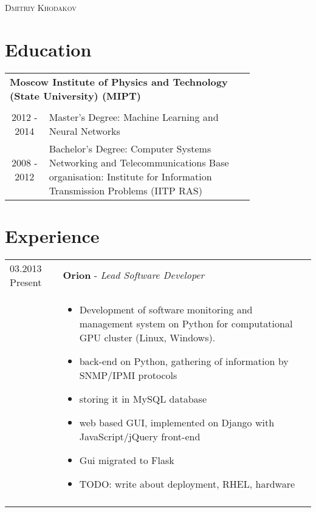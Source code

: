 \documentclass[a4paper, oneside, final]{scrartcl}
\begin{document}
\begin{center} %


{\fontsize{24}{24}\selectfont\scshape Dmitriy Khodakov} %

\section{\textbf{Education}}

\begin{tabularx}{0.99\linewidth}{cp{0.8\linewidth}l}
\multicolumn{2}{l}{\textbf{Moscow Institute of Physics and Technology (State University) (MIPT)}} \\
&\quad\\
 2012 - 2014 &  {Master's Degree: Machine Learning and Neural Networks} \\
 2008 - 2012 &  {Bachelor's Degree: Computer Systems Networking and Telecommunications}
    \newline Base organisation: Institute for Information Transmission Problems (IITP RAS) \\
\end{tabularx}

\section{\textbf{Experience}}
\begin{tabularx}{0.99\linewidth}{p{1.5cm}p{12.3cm}}
 03.2013 Present & \textbf{Orion} - \textit{Lead Software Developer} \\
&   \begin{itemize}
    \item Development of software monitoring and management system on Python for computational GPU cluster (Linux, Windows).
    \item back-end on Python, gathering of information by SNMP/IPMI protocols
    \item storing it in MySQL database
    \item web based GUI, implemented on Django with JavaScript/jQuery front-end
    \item Gui migrated to Flask
    \item TODO: write about deployment, RHEL, hardware
    \end{itemize}
\\ 
&\quad\\


\end{tabularx}
\end{center}
\end{document}
